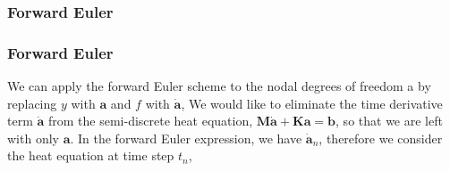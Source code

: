 \documentclass[notes]{beamer}
\begin{document}
\begin{frame}
\frametitle{Forward Euler}
\end{frame}

\begin{frame}
\frametitle{Forward Euler}
We can apply the forward Euler scheme to the nodal degrees of freedom a by replacing
$y$ with $\mathbf{a}$ and $f$ with $\dot{\mathbf{a}}$,
We would like to eliminate the time derivative term $\dot{\mathbf{a}}$ from the semi-discrete heat equation, $\mathbf{M} \dot{\mathbf{a}} + \mathbf{Ka = b}$, so that we are left with only $\mathbf{a}$. In the forward Euler expression, we have $\dot{\mathbf{a}}_n$, therefore we consider the heat equation at time step $t_n$,
\end{frame}
\end{document}
